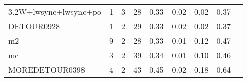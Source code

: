 {\begin{tabular}{l|r|r|r|r|r|r|r|l}
3.2W+lwsync+lwsync+po                       & 1                                                                                                 & 3                                                                                                & 28                                                                                                                   & 0.33                            & 0.02                    & {\color[HTML]{00009B} 0.02}    & 0.37                       \\
DETOUR0928                                  & 1                                                                                                 & 2                                                                                                & 29                                                                                                                   & 0.33                            & 0.02                    & {\color[HTML]{00009B} 0.02}    & 0.37                       \\
m2                                          & 9                                                                                                 & 2                                                                                                & 28                                                                                                                   & 0.33                            & 0.01                    & {\color[HTML]{00009B} 0.12}    & 0.47                       \\
mc                                          & 3                                                                                                 & 2                                                                                                & 39                                                                                                                   & 0.34                            & 0.01                    & {\color[HTML]{00009B} 0.10}    & 0.46                       \\
MOREDETOUR0398                              & 4                                                                                                 & 2                                                                                                & 43                                                                                                                   & 0.45                            & 0.02                    & {\color[HTML]{00009B} 0.18}    & 0.64                       \\

\end{tabular}}
